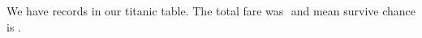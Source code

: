 \documentclass[preview]{standalone}
\begin{document}
%

%




We have  records in our titanic table. The total fare was $$  and mean survive chance is .


\end{document}

